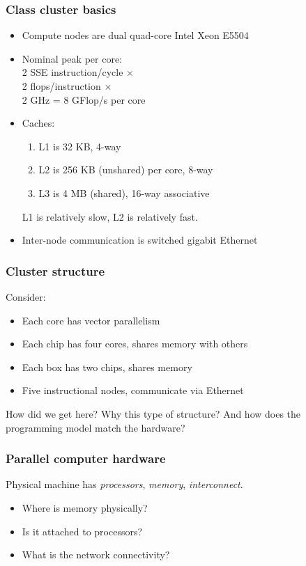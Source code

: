 \documentclass{beamer}
\begin{document}
\begin{frame}
  \frametitle{Class cluster basics}

  \begin{itemize}
  \item
    Compute nodes are dual quad-core Intel Xeon E5504
  \item
    Nominal peak per core: \\
    \hspace{5mm} 2 SSE instruction/cycle $\times$ \\
    \hspace{5mm} 2 flops/instruction $\times$ \\
    \hspace{5mm} 2 GHz = 8 GFlop/s per core
  \item
    Caches:
    \begin{enumerate}
      \item L1 is 32 KB, 4-way
      \item L2 is 256 KB (unshared) per core, 8-way
      \item L3 is 4 MB (shared), 16-way associative
    \end{enumerate}
    L1 is relatively slow, L2 is relatively fast.
  \item Inter-node communication is switched gigabit Ethernet
  \end{itemize}
\end{frame}


\begin{frame}
  \frametitle{Cluster structure}

  Consider:
  \begin{itemize}
  \item Each core has vector parallelism
  \item Each chip has four cores, shares memory with others
  \item Each box has two chips, shares memory
  \item Five instructional nodes, communicate via Ethernet
  \end{itemize}
  How did we get here? Why this type of structure?  And how does the
  programming model match the hardware?

\end{frame}


\begin{frame}
  \frametitle{Parallel computer hardware}
  
  Physical machine has {\em processors}, {\em memory}, {\em interconnect}.
  \begin{itemize}
  \item Where is memory physically?
  \item Is it attached to processors?
  \item What is the network connectivity?
  \end{itemize}
\end{frame}
\end{document}
